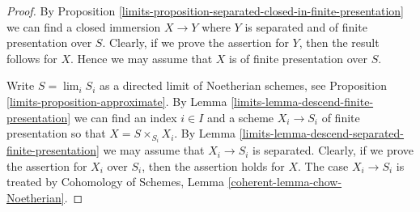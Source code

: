 \begin{proof}

By Proposition \ref{limits-proposition-separated-closed-in-finite-presentation}
we can find a closed immersion $X \to Y$ where $Y$ is separated
and of finite presentation over $S$. Clearly, if we prove the assertion
for $Y$, then the result follows for $X$. Hence we may assume that
$X$ is of finite presentation over $S$.

\medskip\noindent
Write $S = \lim_i S_i$ as a directed limit of Noetherian schemes, see
Proposition \ref{limits-proposition-approximate}. By
Lemma \ref{limits-lemma-descend-finite-presentation} we can
find an index $i \in I$ and a scheme $X_i \to S_i$ of finite presentation
so that $X = S \times_{S_i} X_i$.
By Lemma \ref{limits-lemma-descend-separated-finite-presentation}
we may assume that $X_i \to S_i$ is separated.
Clearly, if we prove the assertion for
$X_i$ over $S_i$, then the assertion holds for $X$. The case
$X_i \to S_i$ is treated by
Cohomology of Schemes, Lemma \ref{coherent-lemma-chow-Noetherian}.
\end{proof}

